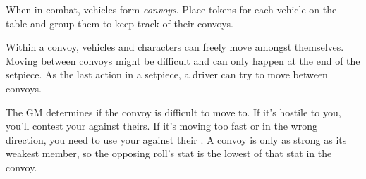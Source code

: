 
When in combat, vehicles form \emph{convoys}. Place tokens for each vehicle on the table and group them to keep track of their convoys.

Within a convoy, vehicles and characters can freely move amongst themselves. Moving between convoys might be difficult and can only happen at the end of the setpiece. As the last action in a setpiece, a driver can try to move between convoys.

The GM determines if the convoy is difficult to move to. If it's hostile to you, you'll contest your  against theirs. If it's moving too fast or in the wrong direction, you need to use your  against their . A convoy is only as strong as its weakest member, so the opposing roll's stat is the lowest of that stat in the convoy.
